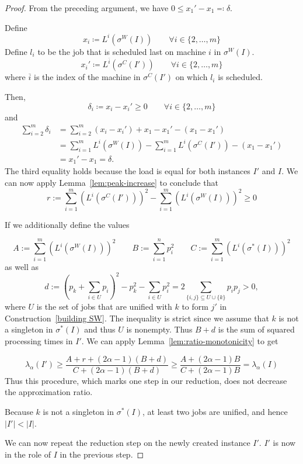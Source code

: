 \documentclass[%
english, titlepage=false %
]{./tum-templates/book/tumbook}
\begin{document}
\begin{proof}
\noindent
From the preceding argument, we have $0 \le x_1'- x_1 \eqqcolon \delta$.

\noindent
Define
\[
x_i \coloneqq L^{i}(\sigma^{W}(I)) \qquad \forall i \in \{2,\dots, m\} 
\]
Define $l_i$ to be the job that is scheduled last on machine $i$ in $\sigma^{W}(I)$. 
\[
x_i' \coloneqq L^{\overline{i}}(\sigma^{C}(I')) \qquad \forall i \in \{2,\dots, m\}
\]
where $\overline{i}$ is the index of the machine in $\sigma^{C}(I')$ on which $l_i$ is scheduled. 

\noindent
Then, 
\[
\delta_i \coloneqq  x_i-x_i' \ge 0 \qquad \forall i \in \{2,\dots, m\}
\]
and 
\begin{align*}
\sum_{i=2}^{m} \delta_i &= \sum_{i=2}^{m} (x_i-x_i') + x_1-x_1' - (x_1-x_1') \\
&= \sum_{i=1}^{m}L^{i}(\sigma^{W}(I)) - \sum_{i=1}^{m}L^{i}(\sigma^{C}(I')) -(x_1-x_1')\\
&= x_1'-x_1 = \delta.
\end{align*}
The third equality holds because the load is equal for both instances $I'$ and $I$.
We can now apply Lemma~\ref{lem:peak-increase} to conclude that 
\[
r:= \sum_{i=1}^m (L^{i}(\sigma^{C}(I')))^2 - \sum_{i=1}^m (L^{i}(\sigma^{W}(I)))^2 \ge 0
\]

\noindent
If we additionally define the values

\[
A:= \sum_{i=1}^m (L^{i}(\sigma^{W}(I)))^2 \qquad B:=\sum_{i=1}^{n}p_i^2 \qquad C:=\sum_{i=1}^m (L^{i}(\sigma^{*}(I)))^2
\]
as well as
\[
d
:=
\left(p_k+\sum_{i\in U}p_i\right)^2
-p_k^2-\sum_{i\in U}p_i^2
=2\sum_{\{i,j\}\subseteq U\cup\{k\}}p_ip_j > 0 ,
\]
where $U$ is the set of jobs that are unified with $k$ to form $j'$ in
Construction~\ref{building SW}. The inequality is strict since we assume that $k$ is not a singleton in $\sigma^*(I)$ and thus $U$ is nonempty. Thus $B+d$ is the sum of squared processing
times in $I'$.
We can apply Lemma~\ref{lem:ratio-monotonicity} to get

\[
\lambda_{\alpha}(I') \ge \frac{A+r+(2\alpha-1)(B+d)}{C+(2\alpha-1)(B+d)} \ge \frac{A+(2\alpha-1)B}{C+(2\alpha-1)B} = \lambda_{\alpha}(I)
\]
Thus this procedure, which marks one step in our reduction, 
does not decrease the approximation ratio.\medskip

Because $k$ is not a singleton in $\sigma^*(I)$, at least two jobs are
unified, and hence $|I'|<|I|$.\medskip

We can now repeat the reduction step on the newly created instance $I'$.
$I'$ is now in the role of $I$ in the previous step.\medskip


\end{proof}
\end{document}
